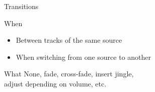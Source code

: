 \documentclass{beamer}
\renewcommand{\emph}[1]{\alert{#1}}
\begin{document}
\begin{frame}{Transitions}

  \begin{block}{When}
  \begin{itemize}
  \item Between tracks of the same source
  \item When switching from one source to another
  \end{itemize}
  \end{block}

  \begin{block}{What}
  \quad None, fade, cross-fade, insert jingle, \\
  \quad\quad adjust depending on volume, etc.
  \end{block}

  \vfill
  \pause


\end{frame}
\end{document}
